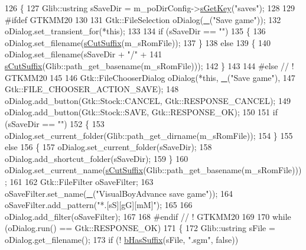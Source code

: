 \begin{DoxyCode}
126 \{
127   Glib::ustring sSaveDir = m\_poDirConfig->\mbox{\hyperlink{class_v_b_a_1_1_config_1_1_section_a7ac9dfabf38bc1db83a6017e130f04ac}{sGetKey}}(\textcolor{stringliteral}{"saves"});
128 
129 \textcolor{preprocessor}{#ifdef GTKMM20}
130 
131   Gtk::FileSelection oDialog(\mbox{\hyperlink{getopt_8c_a86a239addea586602343007a370bf8ad}{\_}}(\textcolor{stringliteral}{"Save game"}));
132   oDialog.set\_transient\_for(*\textcolor{keyword}{this});
133 
134   \textcolor{keywordflow}{if} (sSaveDir == \textcolor{stringliteral}{""})
135   \{
136     oDialog.set\_filename(\mbox{\hyperlink{namespace_v_b_a_ad362cd74dbe4234578a0a124f3522dcf}{sCutSuffix}}(m\_sRomFile));
137   \}
138   \textcolor{keywordflow}{else}
139   \{
140     oDialog.set\_filename(sSaveDir + \textcolor{stringliteral}{"/"} +
141                          \mbox{\hyperlink{namespace_v_b_a_ad362cd74dbe4234578a0a124f3522dcf}{sCutSuffix}}(Glib::path\_get\_basename(m\_sRomFile)));
142   \}
143 
144 \textcolor{preprocessor}{#else // ! GTKMM20}
145 
146   Gtk::FileChooserDialog oDialog(*\textcolor{keyword}{this}, \mbox{\hyperlink{getopt_8c_a86a239addea586602343007a370bf8ad}{\_}}(\textcolor{stringliteral}{"Save game"}),
147                                  Gtk::FILE\_CHOOSER\_ACTION\_SAVE);
148   oDialog.add\_button(Gtk::Stock::CANCEL, Gtk::RESPONSE\_CANCEL);
149   oDialog.add\_button(Gtk::Stock::SAVE,   Gtk::RESPONSE\_OK);
150 
151   \textcolor{keywordflow}{if} (sSaveDir == \textcolor{stringliteral}{""})
152   \{
153     oDialog.set\_current\_folder(Glib::path\_get\_dirname(m\_sRomFile));
154   \}
155   \textcolor{keywordflow}{else}
156   \{
157     oDialog.set\_current\_folder(sSaveDir);
158     oDialog.add\_shortcut\_folder(sSaveDir);
159   \}
160   oDialog.set\_current\_name(\mbox{\hyperlink{namespace_v_b_a_ad362cd74dbe4234578a0a124f3522dcf}{sCutSuffix}}(Glib::path\_get\_basename(m\_sRomFile)));
161 
162   Gtk::FileFilter oSaveFilter;
163   oSaveFilter.set\_name(\mbox{\hyperlink{getopt_8c_a86a239addea586602343007a370bf8ad}{\_}}(\textcolor{stringliteral}{"VisualBoyAdvance save game"}));
164   oSaveFilter.add\_pattern(\textcolor{stringliteral}{"*.[sS][gG][mM]"});
165 
166   oDialog.add\_filter(oSaveFilter);
167 
168 \textcolor{preprocessor}{#endif // ! GTKMM20}
169 
170   \textcolor{keywordflow}{while} (oDialog.run() == Gtk::RESPONSE\_OK)
171   \{
172     Glib::ustring sFile = oDialog.get\_filename();
173     \textcolor{keywordflow}{if} (! \mbox{\hyperlink{namespace_v_b_a_ad93561fe4528e04192e066e138c3572b}{bHasSuffix}}(sFile, \textcolor{stringliteral}{".sgm"}, \textcolor{keyword}{false}))

\end{DoxyCode}
